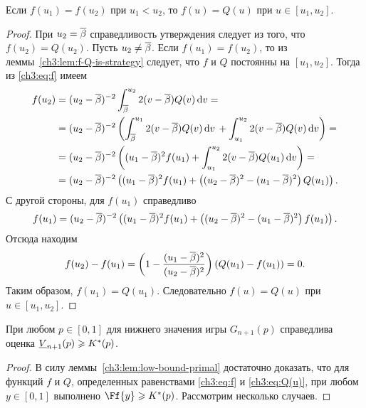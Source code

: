 {\begin{lemma}
  \label{ch3:lem:f=Q}
  Если $f(u_1) = f(u_2)$ при $u_1 < u_2$, то $f(u) = Q(u)$ при $u \in [u_1, u_2]$.
\end{lemma}
\begin{proof}
  При $u_2 = {{\overline{\beta}}}$ справедливость утверждения следует из того, что $f(u_2) = Q(u_2)$.
  Пусть $u_2 \neq {{\overline{\beta}}}$. 
  Если $f(u_1) = f(u_2)$, то из леммы~\ref{ch3:lem:f-Q-is-strategy} следует, что $f$ и $Q$ постоянны на $[u_1, u_2]$.
  Тогда из \eqref{ch3:eq:f} имеем
  \begin{align*}
    f(u_2)
    &= (u_2 - {{\overline{\beta}}})^{-2} \int_{{{\overline{\beta}}}}^{u_2} 2 (v - {{\overline{\beta}}}) Q(v) \mathop{}\!\mathrm{d} v = \\
    &= (u_2 - {{\overline{\beta}}})^{-2} \left(
      \int_{{{\overline{\beta}}}}^{u_1} 2 (v - {{\overline{\beta}}}) Q(v) \mathop{}\!\mathrm{d} v \, +
      \int_{u_1}^{u_2} 2 (v - {{\overline{\beta}}}) Q(v) \mathop{}\!\mathrm{d} v
      \right) = \\
    &= (u_2 - {{\overline{\beta}}})^{-2} \left(
      (u_1 - {{\overline{\beta}}})^2 f(u_1) +
      \int_{u_1}^{u_2} 2 (v - {{\overline{\beta}}}) Q(u_1) \mathop{}\!\mathrm{d} v
      \right) = \\
    &= (u_2 - {{\overline{\beta}}})^{-2} \left(
      (u_1 - {{\overline{\beta}}})^2 f(u_1) +
      \left( (u_2 - {{\overline{\beta}}})^2 - (u_1 - {{\overline{\beta}}})^2 \right) Q(u_1)
      \right).
  \end{align*}
  С другой стороны, для $f(u_1)$ справедливо
  \begin{equation*}
    f(u_1) = (u_2 - {{\overline{\beta}}})^{-2} \left(
      (u_1 - {{\overline{\beta}}})^2 f(u_1) +
      \left( (u_2 - {{\overline{\beta}}})^2 - (u_1 - {{\overline{\beta}}})^2 \right) f(u_1)
    \right).
  \end{equation*}
  Отсюда находим
  \begin{equation*}
    f(u_2) - f(u_1) = \left(1 - \frac{(u_1 - {{\overline{\beta}}})^2}{(u_2 - {{\overline{\beta}}})^2}\right)(Q(u_1) - f(u_1)) = 0.
  \end{equation*}
  Таким образом, $f(u_1) = Q(u_1)$.
  Следовательно $f(u) = Q(u)$ при $u \in [u_1, u_2]$.
\end{proof}

\begin{theorem}\label{ch3:thm:V-bound}
  При любом $p \in [0, 1]$ для нижнего значения игры $G_{n+1}(p)$ справедлива оценка $\LV{n+1}(p) \geqslant K^*(p)$.
\end{theorem}
\begin{proof}
  В силу леммы~\ref{ch3:lem:low-bound-primal} достаточно доказать, что для функций $f$ и $Q$, определенных равенствами \eqref{ch3:eq:f} и \eqref{ch3:eq:Q(u)}, при любом $y \in [0, 1]$ выполнено $\Ff{y} \geqslant K^*(p)$.
  Рассмотрим несколько случаев.


\end{proof}}
